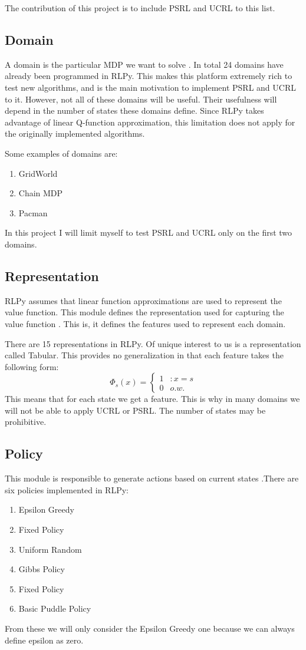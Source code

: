 \documentclass[12pt]{article}
\begin{document}
The contribution of this project is to include PSRL and UCRL to this list.
\subsection{Domain}

A domain is the particular MDP we want to solve \citep{RLPy}. In total 24 domains have already been programmed in RLPy. This makes this platform extremely rich to test new algorithms, and is the main motivation to implement PSRL and UCRL to it. However, not all of these domains will be useful. Their usefulness will depend in the number of states these domains define. Since RLPy takes advantage of linear Q-function approximation, this limitation does not apply for the originally implemented algorithms.

Some examples of domains are:
\begin{enumerate}
\item GridWorld
\item Chain MDP
\item Pacman
\end{enumerate}

In this project I will limit myself to test PSRL and UCRL only on the first two domains.
\subsection{Representation}
RLPy assumes that linear function approximations are used to represent the value function. This module defines the representation used for capturing the value function \citep{RLPy}. This is, it defines the features used to represent each domain. 

There are 15 representations in RLPy. Of unique interest to us is a representation called Tabular. This provides no generalization in that each feature takes the following form:
$$\Phi_s(x) = \left\lbrace \begin{array}{lr}
1 & :x=s\\
0 & o.w. 
\end{array} \right.$$
This means that for each state we get a feature. This is why in many domains we will not be able to apply UCRL or PSRL. The number of states may be prohibitive.
 
\subsection{Policy}
This module is responsible to generate actions based on current states \citep{RLPy}.There are six policies implemented in RLPy:
\begin{enumerate}
\item Epsilon Greedy
\item Fixed Policy
\item Uniform Random
\item Gibbs Policy
\item Fixed Policy
\item Basic Puddle Policy
\end{enumerate}
From these we will only consider the Epsilon Greedy one because we can always define epsilon as zero.
\end{document}
